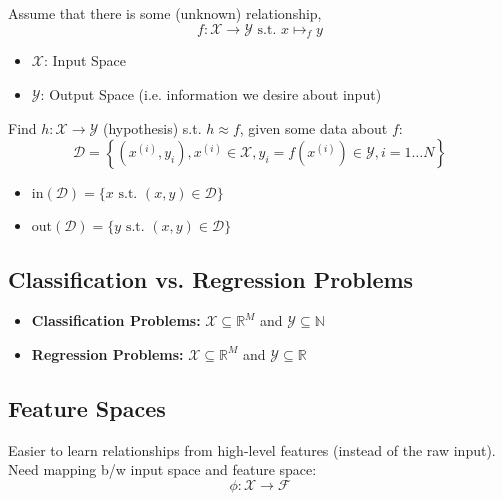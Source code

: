 \begin{definition}
    Assume that there is some (unknown) relationship, 
    \begin{equation*}
        f: \mathcal{X} \rightarrow \mathcal{Y} \text{ s.t. } x \mapsto_f y
    \end{equation*}
    \begin{itemize}
        \item $\mathcal{X}$: Input Space
        \item $\mathcal{Y}$: Output Space (i.e. information we desire about input)
    \end{itemize}
    \vspace{1em}

    Find $h: \mathcal{X} \rightarrow \mathcal{Y}$ (hypothesis) s.t. $h \approx f$, given some data about $f$: 
    \begin{equation*}
        \mathcal{D} = \left\{ \left(x^{(i)}, y_i\right), x^{(i)} \in \mathcal{X}, y_i = f\left(x^{(i)}\right) \in \mathcal{Y}, i = 1 \ldots N \right\}
    \end{equation*}

    \begin{itemize}
        \item $\text{in}(\mathcal{D}) = \{x \text{ s.t. } (x,y) \in \mathcal{D}\}$
        \item $\text{out}(\mathcal{D}) = \{y \text{ s.t. } (x,y) \in \mathcal{D}\}$
    \end{itemize}
\end{definition}

\subsection{Classification vs. Regression Problems}
\begin{definition}
    \begin{itemize}
        \item \textbf{Classification Problems:} $\mathcal{X} \subseteq \mathbb{R}^M$ and $\mathcal{Y} \subseteq \mathbb{N}$
        \item \textbf{Regression Problems:} $\mathcal{X} \subseteq \mathbb{R}^M$ and $\mathcal{Y} \subseteq \mathbb{R}$
    \end{itemize}
\end{definition}

\subsection{Feature Spaces}
\begin{definition}
    Easier to learn relationships from high-level features (instead of the raw input). Need mapping b/w input space and feature space:
    $$\phi: \mathcal{X} \rightarrow \mathcal{F}$$
\end{definition}